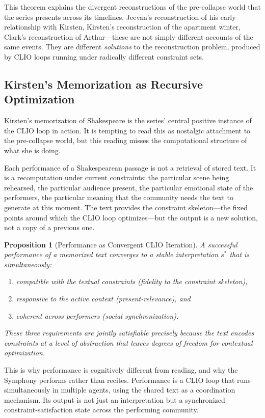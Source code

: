 \documentclass[12pt, oneside]{article}
\theoremstyle{plain}
\newtheorem{proposition}[theorem]{Proposition}
\theoremstyle{definition}
\theoremstyle{remark}
\begin{document}
This theorem explains the divergent reconstructions of the pre-collapse
world that the series presents across its timelines. Jeevan's
reconstruction of his early relationship with Kirsten, Kirsten's
reconstruction of the apartment winter, Clark's reconstruction of
Arthur---these are not simply different accounts of the same events.
They are different \emph{solutions} to the reconstruction problem,
produced by CLIO loops running under radically different constraint
sets.

\subsection{Kirsten's Memorization as Recursive Optimization}

Kirsten's memorization of Shakespeare is the series' central
positive instance of the CLIO loop in action. It is tempting to
read this as nostalgic attachment to the pre-collapse world, but
this reading misses the computational structure of what she is
doing.

Each performance of a Shakespearean passage is not a retrieval of
stored text. It is a recomputation under current constraints: the
particular scene being rehearsed, the particular audience present,
the particular emotional state of the performers, the particular
meaning that the community needs the text to generate at this
moment. The text provides the constraint skeleton---the fixed
points around which the CLIO loop optimizes---but the output is a
new solution, not a copy of a previous one.

\begin{proposition}[Performance as Convergent CLIO Iteration]
A successful performance of a memorized text converges to a stable
interpretation $s^*$ that is simultaneously:
\begin{enumerate}
  \item compatible with the textual constraints (fidelity to the
  constraint skeleton),
  \item responsive to the active context (present-relevance), and
  \item coherent across performers (social synchronization).
\end{enumerate}
These three requirements are jointly satisfiable precisely because
the text encodes constraints at a level of abstraction that leaves
degrees of freedom for contextual optimization.
\end{proposition}

This is why performance is cognitively different from reading, and
why the Symphony performs rather than recites. Performance is a
CLIO loop that runs simultaneously in multiple agents, using the
shared text as a coordination mechanism. Its output is not just an
interpretation but a synchronized constraint-satisfaction state
across the performing community.
\end{document}
